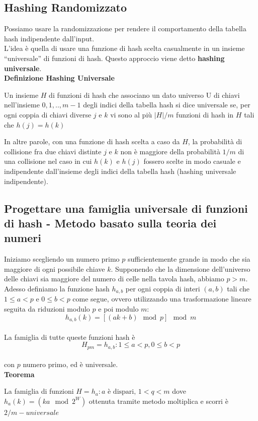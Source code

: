 \subsection{Hashing Randomizzato}
Possiamo usare la randomizzazione per rendere il comportamento della tabella hash indipendente dall'input.\\
L’idea è quella di usare una funzione di hash scelta casualmente in un insieme
“universale” di funzioni di hash.
Questo approccio viene detto \textbf{hashing universale}.\medskip\\
\textbf{Definizione Hashing Universale}
\begin{definition}
Un insieme $H$ di funzioni di hash che associano un dato universo U di chiavi nell'insieme ${0,1,..,m-1}$ degli indici della tabella 
hash si dice universale se, per ogni coppia di chiavi diverse $j$ e $k$ vi sono al più $|H|/m$ funzioni di hash in $H$ tali che 
$h(j)=h(k)$\\    
\end{definition}
\noindent In altre parole, con una funzione di hash scelta a caso da $H$, la probabilità di collisione fra
due chiavi distinte $j$ e $k$ non è maggiore della probabilità $1/m$ di una collisione nel caso in cui
$h(k)$ e $h(j)$ fossero scelte in modo casuale e indipendente dall’insieme degli indici della tabella
hash (hashing universale indipendente).

\subsection{Progettare una famiglia universale di funzioni di hash - Metodo basato sulla teoria dei numeri}
Iniziamo scegliendo un numero primo $p$ sufficientemente grande in modo che sia maggiore di
ogni possibile chiave $k$. Supponendo che la dimensione dell’universo delle chiavi sia maggiore
del numero di celle nella tavola hash, abbiamo $p>m$. Adesso definiamo la funzione hash $h_{a,b}$
per ogni coppia di interi $(a, b)$ tali che $1 \le a < p$ e $0 \le b < p$ come segue, ovvero utilizzando
una trasformazione lineare seguita da riduzioni modulo $p$ e poi modulo $m$:\\
$$h_{a,b}(k)=[(ak+b)\mod p] \mod m$$\\
La famiglia di tutte queste funzioni hash è\\
$$ H_{pm} = { h_{a,b}: 1 \le a < p, 0 \le b < p } $$\\
con $p$ numero primo, ed è universale.\medskip\\
\textbf{Teorema}
\begin{theorem}
    La famiglia di funzioni $H={h_a:a \text{ è dispari, }1<q<m}$ dove
    $h_a(k)=(ka \mod 2^W)$ ottenuta tramite metodo moltiplica e scorri è $2/m-universale$
\end{theorem}

